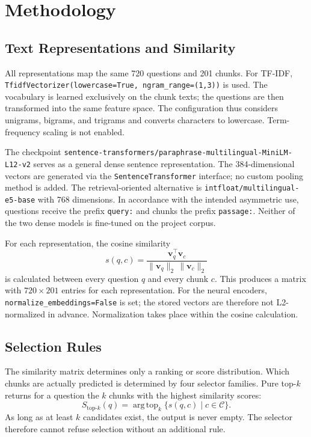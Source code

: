\documentclass[11pt]{article}
\begin{document}
\section{Methodology}

\subsection{Text Representations and Similarity}

All representations map the same 720 questions and 201 chunks. For TF-IDF, \texttt{TfidfVectorizer(lowercase=True, ngram\_range=(1,3))} is used. The vocabulary is learned exclusively on the chunk texts; the questions are then transformed into the same feature space. The configuration thus considers unigrams, bigrams, and trigrams and converts characters to lowercase. Term-frequency scaling is not enabled.

The checkpoint \nolinkurl{sentence-transformers/paraphrase-multilingual-MiniLM-L12-v2} serves as a general dense sentence representation. The 384-dimensional vectors are generated via the \texttt{SentenceTransformer} interface; no custom pooling method is added. The retrieval-oriented alternative is \texttt{intfloat/multilingual-e5-base} with 768 dimensions. In accordance with the intended asymmetric use, questions receive the prefix \texttt{query:} and chunks the prefix \texttt{passage:}. Neither of the two dense models is fine-tuned on the project corpus.

For each representation, the cosine similarity
\begin{equation}
s(q,c)=\frac{\mathbf{v}_q^\top\mathbf{v}_c}
{\lVert\mathbf{v}_q\rVert_2\,\lVert\mathbf{v}_c\rVert_2}
\end{equation}
is calculated between every question $q$ and every chunk $c$. This produces a matrix with $720\times201$ entries for each representation. For the neural encoders, \texttt{normalize\_embeddings=False} is set; the stored vectors are therefore not L2-normalized in advance. Normalization takes place within the cosine calculation.

\subsection{Selection Rules}

The similarity matrix determines only a ranking or score distribution. Which chunks are actually predicted is determined by four selector families. Pure top-$k$ returns for a question the $k$ chunks with the highest similarity scores:
\begin{equation}
S_{\mathrm{top}\text{-}k}(q)=\operatorname{arg\,top}_{k}
\{s(q,c)\mid c\in\mathcal{C}\}.
\end{equation}
As long as at least $k$ candidates exist, the output is never empty. The selector therefore cannot refuse selection without an additional rule.
\end{document}
